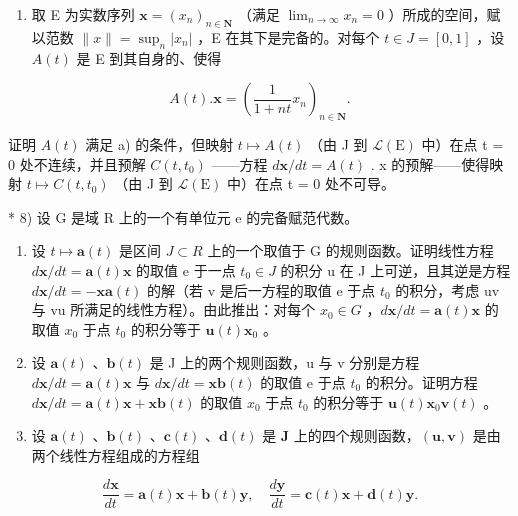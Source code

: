 \begin{enumerate}
\def\labelenumi{\alph{enumi})}
\setcounter{enumi}{1}
\tightlist
\item
  取 E 为实数序列 \(\mathbf{x}=(x_{n})_{n\in\mathbf{N}}\) （满足 \(\lim_{n\to\infty}x_{n}=0\) ）所成的空间，赋以范数 \(\|x\|=\sup_{n}|x_{n}|\) ，E 在其下是完备的。对每个 \(t\in J=[0,1]\) ，设 \(A(t)\) 是 E 到其自身的、使得
\end{enumerate}

\[
A (t). \mathbf {x} = \left(\frac {1}{1 + n t} x _ {n}\right) _ {n \in \mathbf {N}}.
\]

证明 \(A(t)\) 满足 a) 的条件，但映射 \(t \mapsto A(t)\) （由 J 到 \(\mathcal{L}(\mathrm{E})\) 中）在点 t = 0 处不连续，并且预解 \(C(t, t_0)\) ——方程 \(d\mathbf{x}/dt = A(t)\) . x 的预解——使得映射 \(t \mapsto C(t, t_0)\) （由 J 到 \(\mathcal{L}(\mathrm{E})\) 中）在点 t = 0 处不可导。

* 8) 设 G 是域 R 上的一个有单位元 e 的完备赋范代数。

\begin{enumerate}
\def\labelenumi{\alph{enumi})}
\item
  设 \(t \mapsto \mathbf{a}(t)\) 是区间 \(J \subset R\) 上的一个取值于 G 的规则函数。证明线性方程 \(d\mathbf{x}/dt = \mathbf{a}(t)\mathbf{x}\) 的取值 e 于一点 \(t_0 \in J\) 的积分 u 在 J 上可逆，且其逆是方程 \(d\mathbf{x}/dt = -\mathbf{x}\mathbf{a}(t)\) 的解（若 v 是后一方程的取值 e 于点 \(t_0\) 的积分，考虑 uv 与 vu 所满足的线性方程）。由此推出：对每个 \(x_0 \in G\) ，\(d\mathbf{x}/dt = \mathbf{a}(t)\mathbf{x}\) 的取值 \(x_0\) 于点 \(t_0\) 的积分等于 \(\mathbf{u}(t)\mathbf{x}_0\) 。
\item
  设 \(\mathbf{a}(t)\) 、\(\mathbf{b}(t)\) 是 J 上的两个规则函数，u 与 v 分别是方程 \(d\mathbf{x}/dt = \mathbf{a}(t)\mathbf{x}\) 与 \(d\mathbf{x}/dt = \mathbf{x}\mathbf{b}(t)\) 的取值 e 于点 \(t_{0}\) 的积分。证明方程 \(d\mathbf{x}/dt = \mathbf{a}(t)\mathbf{x} + \mathbf{x}\mathbf{b}(t)\) 的取值 \(x_{0}\) 于点 \(t_{0}\) 的积分等于 \(\mathbf{u}(t)\mathbf{x}_{0}\mathbf{v}(t)\) 。
\item
  设 \(\mathbf{a}(t)\) 、\(\mathbf{b}(t)\) 、\(\mathbf{c}(t)\) 、\(\mathbf{d}(t)\) 是 \(\mathbf{J}\) 上的四个规则函数，\((\mathbf{u}, \mathbf{v})\) 是由两个线性方程组成的方程组
\end{enumerate}

\[
\frac {d \mathbf {x}}{d t} = \mathbf {a} (t) \mathbf {x} + \mathbf {b} (t) \mathbf {y}, \quad \frac {d \mathbf {y}}{d t} = \mathbf {c} (t) \mathbf {x} + \mathbf {d} (t) \mathbf {y}.
\]

